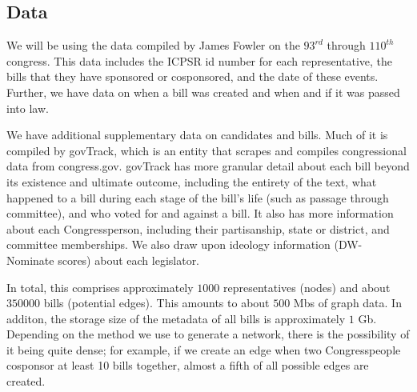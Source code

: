 \subsection{Data}

We will be using the data compiled by James Fowler on the $93^{rd}$ through
$110^{th}$ congress. This data includes the ICPSR id number for each
representative, the bills that they have sponsored or cosponsored, and the date
of these events.  Further, we have data on when a bill was created and when and
if it was passed into law.

We have additional supplementary data on candidates and bills. Much of it is
compiled by govTrack, which is an entity that scrapes and compiles congressional
data from congress.gov. govTrack has more granular detail about each bill beyond
its existence and ultimate outcome, including the  entirety of the text, what
happened to a bill during each stage of the  bill's life (such as passage
through committee), and who voted for and against a bill. It also has more
information about each Congressperson, including their partisanship, state or
district, and committee memberships. We also draw upon ideology information (DW-
Nominate scores) about each legislator.

In total, this comprises approximately $1000$ representatives (nodes) and about
$350000$ bills (potential edges). This amounts to about $500$ Mbs of graph
data. In additon, the storage size of the metadata of all bills is
approximately $1$ Gb. Depending on the method we use to generate a network,
there is the possibility of it being quite dense; for example, if we create an
edge when two Congresspeople cosponsor at least 10 bills together, almost a
fifth of all possible edges are created.
